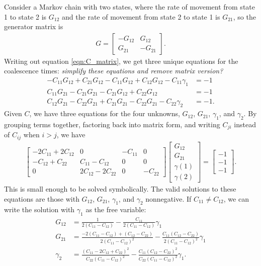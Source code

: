 \documentclass{article}
\newcommand{\plr}[1]{{\em \color{blue} #1}}
\begin{document}
Consider a Markov chain with two states, 
where the rate of movement from state 1 to state 2 is $G_{12}$
and the rate of movement from state 2 to state 1 is $G_{21}$,
so the generator matrix is
\begin{align*}
G = 
    \begin{bmatrix}
        -G_{12}  & G_{12} \\
         G_{21}  & -G_{21}
    \end{bmatrix}.
\end{align*}
Writing out equation \ref{eqn:C_matrix}, we get three unique equations
for the coalescence times:
\plr{simplify these equations and remove matrix version?}
\begin{align*}
   -C_{11} G_{12} + C_{21} G_{12} - C_{11} G_{12} + C_{12} G_{12} - C_{11} \gamma_1 &= -1 \\
    C_{11} G_{21} - C_{21} G_{21} - C_{21} G_{12} + C_{22} G_{12}                   &= -1 \\
    C_{12} G_{21} - C_{22} G_{21} + C_{21} G_{21} - C_{22} G_{21} - C_{22} \gamma_2 &= -1 .
\end{align*}
Given $C$, we have three equations for the four unknowns, 
$G_{12}$, $G_{21}$, $\gamma_{1}$, and $\gamma_{2}$.
By grouping terms together, factoring back into matrix form, 
and writing $C_{ji}$ instead of $C_{ij}$ when $i > j$,
we have
\begin{align*}
\begin{bmatrix}
-2C_{11} + 2C_{12} & 0                 & -C_{11} & 0       \\
-C_{12} + C_{22}   & C_{11} - C_{12}   & 0       & 0       \\
0                  & 2C_{12} - 2C_{22} & 0       & -C_{22}
\end{bmatrix}
\begin{bmatrix}
G_{12} \\ G_{21} \\ \gamma(1) \\ \gamma(2)
\end{bmatrix}
=
\begin{bmatrix}
-1 \\ -1 \\ -1
\end{bmatrix}.
\end{align*}
This is small enough to be solved symbolically. 
The valid solutions to these equations are those with $G_{12}$, $G_{21}$, $\gamma_1$,
and $\gamma_2$ nonnegative.
If $C_{11} \neq C_{12}$, 
we can write the solution with $\gamma_1$ as the free variable:
\begin{align*}
G_{12} &= \frac{1}{2(C_{11} - C_{12})} - \frac{C_{11}}{2(C_{11} - C_{12})}\gamma_1 \\
G_{21} &= \frac{-2(C_{11} - C_{12}) + (C_{12} - C_{22})}{2(C_{11} - C_{12})^2}
	- \frac{C_{11}(C_{12} - C_{22})}{2(C_{11} - C_{12})^2}\gamma_1 \\
\gamma_2 &= \frac{(C_{11} - 2C_{12} + C_{22})^2}{C_{22}(C_{11} - C_{12})^2}
	- \frac{C_{11}(C_{12} - C_{22})^2}{C_{22}(C_{11} - C_{12})^2}\gamma_1.
\end{align*}
\end{document}
